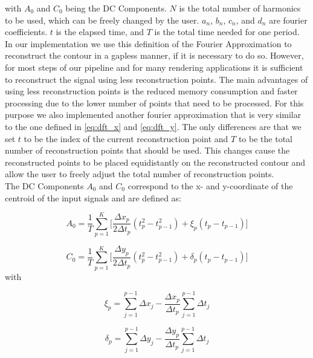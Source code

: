 \documentclass[thesis.tex]{subfiles}
\begin{document}
with $ A_0$ and $C_0 $ being the DC Components. $N$ is the total number of harmonics to be used, which can be freely changed by the user. $a_n$, $b_n$, $c_n$, and $d_n$ are fourier coefficients. $t$ is the elapsed time, and $T$ is the total time needed for one period. \\ In our implementation we use this definition of the Fourier Approximation to reconstruct the contour in a gapless manner, if it is necessary to do so. However, for most steps of our pipeline and for many rendering applications it is sufficient to reconstruct the signal using less reconstruction points. The main advantages of using less reconstruction points is the reduced memory consumption and faster processing due to the lower number of points that need to be processed. For this purpose we also implemented another fourier approximation that is very similar to the one defined in \ref{eq:dft_x} and \ref{eq:dft_y}. The only differences are that we set $t$ to be the index of the current reconstruction point and $T$ to be the total number of reconstruction points that should be used. This changes cause the reconstructed points to be placed equidistantly on the reconstructed contour and allow the user to freely adjust the total number of reconstruction points.\\ 

The DC Components $A_0$ and $C_0$ correspond to the x- and y-coordinate of the centroid of the input signals and are defined as: 

\begin{equation} \label{eq:dft_dc_x}
 A_0 =  \frac{1}{T} \sum_{p=1}^{K} \bigg[ \frac{\Delta x_p}{2 \Delta t_p} (t_p^2 - t_{p-1}^2) + \xi_p(t_p - t_{p-1})\bigg]
\end{equation}  

\begin{equation} \label{eq:dft_dc_y}
 C_0 =  \frac{1}{T} \sum_{p=1}^{K} \bigg[ \frac{\Delta y_p}{2 \Delta t_p} (t_p^2 - t_{p-1}^2) + \delta_p(t_p - t_{p-1})\bigg]
\end{equation}   
with

\begin{equation} \label{eq:dft_xi}
 \xi_p =  \sum_{j=1}^{p-1} \Delta x_j - \frac{\Delta x_p}{\Delta t_p} \sum_{j=1}^{p-1}\Delta t_j
\end{equation}  

\begin{equation} \label{eq:dft_delta}
 \delta_p =  \sum_{j=1}^{p-1} \Delta y_j - \frac{\Delta y_p}{\Delta t_p} \sum_{j=1}^{p-1}\Delta t_j
\end{equation}  
 
\end{document}
